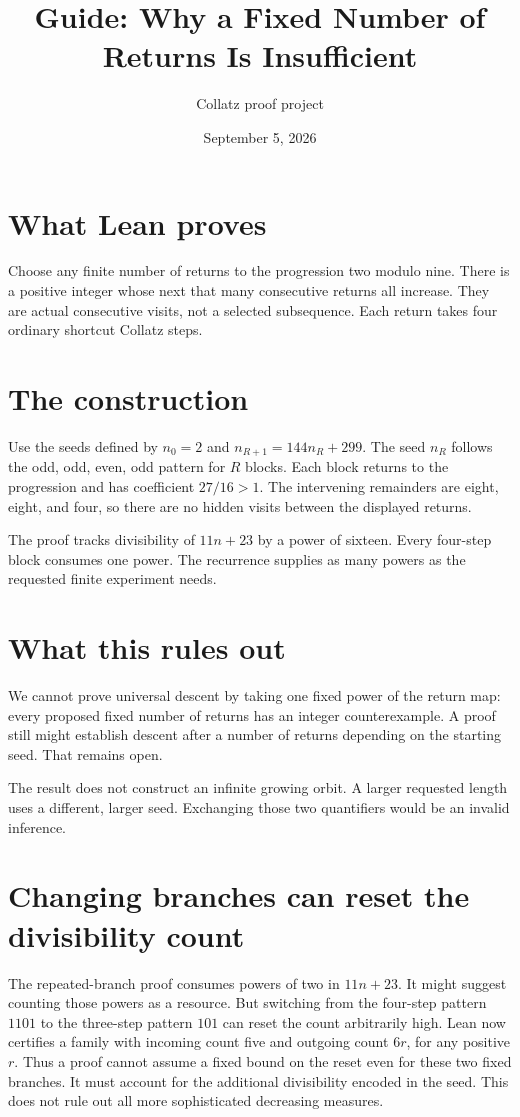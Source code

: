 \documentclass[10pt]{article}
\title{Guide: Why a Fixed Number of Returns Is Insufficient}
\author{Collatz proof project}
\date{September 5, 2026}
\begin{document}
\maketitle
\raggedright
\section*{What Lean proves}
Choose any finite number of returns to the progression two modulo nine.
There is a positive integer whose next that many consecutive returns all
increase. They are actual consecutive visits, not a selected subsequence.
Each return takes four ordinary shortcut Collatz steps.

\section*{The construction}
Use the seeds defined by $n_0=2$ and $n_{R+1}=144n_R+299$.
The seed $n_R$ follows the odd, odd, even, odd pattern for $R$ blocks.
Each block returns to the progression and has coefficient $27/16>1$.
The intervening remainders are eight, eight, and four, so there are no
hidden visits between the displayed returns.

The proof tracks divisibility of $11n+23$ by a power of sixteen. Every
four-step block consumes one power. The recurrence supplies as many
powers as the requested finite experiment needs.

\section*{What this rules out}
We cannot prove universal descent by taking one fixed power of the return
map: every proposed fixed number of returns has an integer counterexample.
A proof still might establish descent after a number of returns depending
on the starting seed. That remains open.

The result does not construct an infinite growing orbit. A larger requested
length uses a different, larger seed. Exchanging those two quantifiers
would be an invalid inference.

\section*{Changing branches can reset the divisibility count}
The repeated-branch proof consumes powers of two in $11n+23$. It might
suggest counting those powers as a resource. But switching from the
four-step pattern $1101$ to the three-step pattern $101$ can reset the
count arbitrarily high. Lean now certifies a family with incoming count
five and outgoing count $6r$, for any positive $r$. Thus a proof cannot
assume a fixed bound on the reset even for these two fixed branches.
It must account for the additional divisibility encoded in the seed.
This does not rule out all more sophisticated decreasing measures.
\end{document}

